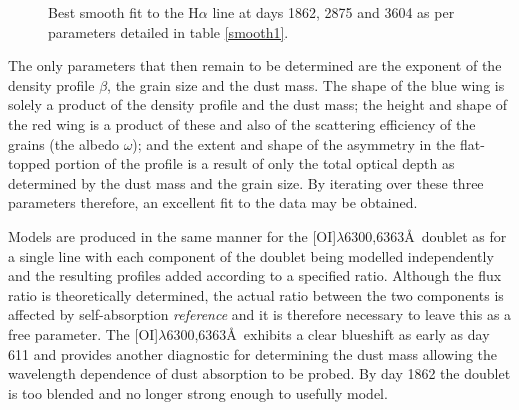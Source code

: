 \documentclass[useAMS,usenatbib,usegraphicx]{mnras}
\begin{document}
\begin{figure}
\begin{center}
\caption{Best smooth fit to the H$\alpha$ line at days 1862, 2875 and 3604 as per parameters detailed in table \ref{smooth1}.}
\label{d1862_3604}
\end{center}
\end{figure}


The only parameters that then remain to be determined are the exponent of the density profile $\beta$, the grain size and the dust mass.  The shape of the blue wing is solely a product of the density profile and the dust mass; the height and shape of the red wing is a product of these and also of the scattering efficiency of the grains (the albedo $\omega$); and the extent and shape of the asymmetry in the flat-topped portion of the profile is a result of only the total optical depth as determined by the dust mass and the grain size.  By iterating over these three parameters therefore, an excellent fit to the data may be obtained.

Models are produced in the same manner for the [OI]$\lambda$6300,6363\AA\ doublet as for a single line with each component of the doublet being modelled independently and the resulting profiles added according to a specified ratio.  Although the flux ratio is theoretically determined, the actual ratio between the two components is affected by self-absorption \textit{reference} and it is therefore necessary to leave this as a free parameter.  The [OI]$\lambda$6300,6363\AA\ exhibits a clear blueshift as early as day 611 and provides another diagnostic for determining the dust mass allowing the wavelength dependence of dust absorption to be probed.  By day 1862 the doublet is too blended and no longer strong enough to usefully model. 
\end{document}
